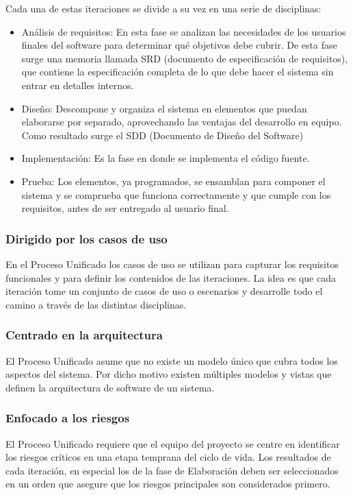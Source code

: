 Cada una de estas iteraciones se divide a su vez en una serie de disciplinas:
\begin{itemize}
	\item Análisis de requisitos: En esta fase se analizan las necesidades de los usuarios finales del software para determinar qué objetivos debe cubrir. De esta fase surge una memoria llamada SRD (documento de especificación de requisitos), que contiene la especificación completa de lo que debe hacer el sistema sin entrar en detalles internos.
	\item Diseño: Descompone y organiza el sistema en elementos que puedan elaborarse por separado, aprovechando las ventajas del desarrollo en equipo. Como resultado surge el SDD (Documento de Diseño del Software)
	\item Implementación: Es la fase en donde se implementa el código fuente.
	\item Prueba: Los elementos, ya programados, se ensamblan para componer el sistema y se comprueba que funciona correctamente y que cumple con los requisitos, antes de ser entregado al usuario final.
\end{itemize}

\subsubsection{Dirigido por los casos de uso}

En el Proceso Unificado los casos de uso se utilizan para capturar los requisitos funcionales y para definir los contenidos de las iteraciones. La idea es que cada iteración tome un conjunto de casos de uso o escenarios y desarrolle todo el camino a través de las distintas disciplinas.

\subsubsection{Centrado en la arquitectura}

El Proceso Unificado asume que no existe un modelo único que cubra todos los aspectos del sistema. Por dicho motivo existen múltiples modelos y vistas que definen la arquitectura de software de un sistema.

\subsubsection{Enfocado a los riesgos}

El Proceso Unificado requiere que el equipo del proyecto se centre en identificar los riesgos críticos en una etapa temprana del ciclo de vida. Los resultados de cada iteración, en especial los de la fase de Elaboración deben ser seleccionados en un orden que asegure que los riesgos principales son considerados primero.

